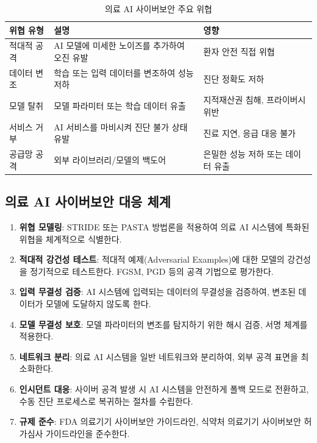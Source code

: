 \begin{table}[htbp]
\centering
\caption{의료 AI 사이버보안 주요 위협}
\label{tab:16_cybersecurity}
\begin{tabularx}{\textwidth}{p{2.5cm}Xp{4cm}}
\toprule
\textbf{위협 유형} & \textbf{설명} & \textbf{영향} \\
\midrule
적대적 공격 & AI 모델에 미세한 노이즈를 추가하여 오진 유발 & 환자 안전 직접 위협 \\
데이터 변조 & 학습 또는 입력 데이터를 변조하여 성능 저하 & 진단 정확도 저하 \\
모델 탈취 & 모델 파라미터 또는 학습 데이터 유출 & 지적재산권 침해, 프라이버시 위반 \\
서비스 거부 & AI 서비스를 마비시켜 진단 불가 상태 유발 & 진료 지연, 응급 대응 불가 \\
공급망 공격 & 외부 라이브러리/모델의 백도어 & 은밀한 성능 저하 또는 데이터 유출 \\
\bottomrule
\end{tabularx}
\end{table}

\subsection{의료 AI 사이버보안 대응 체계}

\begin{enumerate}
 \item \textbf{위협 모델링}: STRIDE 또는 PASTA 방법론을 적용하여 의료 AI 시스템에 특화된 위협을 체계적으로 식별한다.
 \item \textbf{적대적 강건성 테스트}: 적대적 예제(Adversarial Examples)에 대한 모델의 강건성을 정기적으로 테스트한다. FGSM, PGD 등의 공격 기법으로 평가한다.
 \item \textbf{입력 무결성 검증}: AI 시스템에 입력되는 데이터의 무결성을 검증하여, 변조된 데이터가 모델에 도달하지 않도록 한다.
 \item \textbf{모델 무결성 보호}: 모델 파라미터의 변조를 탐지하기 위한 해시 검증, 서명 체계를 적용한다.
 \item \textbf{네트워크 분리}: 의료 AI 시스템을 일반 네트워크와 분리하여, 외부 공격 표면을 최소화한다.
 \item \textbf{인시던트 대응}: 사이버 공격 발생 시 AI 시스템을 안전하게 폴백 모드로 전환하고, 수동 진단 프로세스로 복귀하는 절차를 수립한다.
 \item \textbf{규제 준수}: FDA 의료기기 사이버보안 가이드라인, 식약처 의료기기 사이버보안 허가심사 가이드라인을 준수한다.
\end{enumerate}

